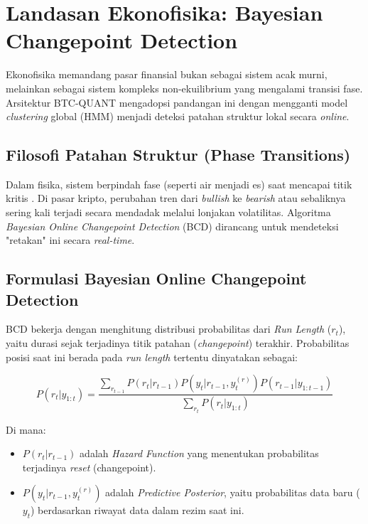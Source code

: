\section{Landasan Ekonofisika: Bayesian Changepoint Detection}
\label{sec:theory}

Ekonofisika memandang pasar finansial bukan sebagai sistem acak murni, melainkan sebagai sistem kompleks non-ekuilibrium yang mengalami transisi fase. Arsitektur BTC-QUANT mengadopsi pandangan ini dengan mengganti model \textit{clustering} global (HMM) menjadi deteksi patahan struktur lokal secara \textit{online}.

\subsection{Filosofi Patahan Struktur (Phase Transitions)}
Dalam fisika, sistem berpindah fase (seperti air menjadi es) saat mencapai titik kritis \cite{mantegna1999introduction}. Di pasar kripto, perubahan tren dari \textit{bullish} ke \textit{bearish} atau sebaliknya sering kali terjadi secara mendadak melalui lonjakan volatilitas. Algoritma \textit{Bayesian Online Changepoint Detection} (BCD) \cite{adams2007bayesian} dirancang untuk mendeteksi "retakan" ini secara \textit{real-time}.

\subsection{Formulasi Bayesian Online Changepoint Detection}
BCD bekerja dengan menghitung distribusi probabilitas dari \textit{Run Length} ($r_t$), yaitu durasi sejak terjadinya titik patahan (\textit{changepoint}) terakhir. Probabilitas posisi saat ini berada pada \textit{run length} tertentu dinyatakan sebagai:

\begin{equation}
    P(r_t | y_{1:t}) = \frac{\sum_{r_{t-1}} P(r_t | r_{t-1}) P(y_t | r_{t-1}, y_{t}^{(r)}) P(r_{t-1} | y_{1:t-1})}{\sum_{r_t} P(r_t | y_{1:t})}
\end{equation}

Di mana:
\begin{itemize}
    \item $P(r_t | r_{t-1})$ adalah \textit{Hazard Function} yang menentukan probabilitas terjadinya \textit{reset} (changepoint).
    \item $P(y_t | r_{t-1}, y_{t}^{(r)})$ adalah \textit{Predictive Posterior}, yaitu probabilitas data baru ($y_t$) berdasarkan riwayat data dalam rezim saat ini.
\end{itemize}

